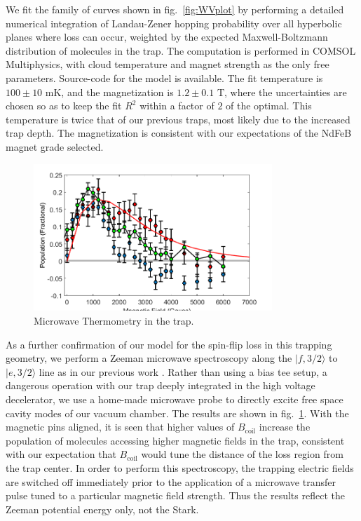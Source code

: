 \documentclass[%
 reprint,
 amsmath,amssymb,
 aps,
prl,
]{revtex4-1}
\begin{document}
We fit the family of curves shown in fig.~\ref{fig:WVplot} by performing a detailed numerical integration of Landau-Zener hopping probability over all hyperbolic planes where loss can occur, weighted by the expected Maxwell-Boltzmann distribution of molecules in the trap. The computation is performed in COMSOL Multiphysics, with cloud temperature and magnet strength as the only free parameters. Source-code for the model is available.\cite{ref:githubCOMcode} The fit temperature is $100\pm10\text{ mK}$, and the magnetization is $1.2\pm0.1\text{ T}$, where the uncertainties are chosen so as to keep the fit $R^2$ within a factor of $2$ of the optimal. This temperature is twice that of our previous traps, most likely due to the increased trap depth. The magnetization is consistent with our expectations of the NdFeB magnet grade selected.

\begin{figure}
\includegraphics[width=90mm]{MW-thermometry.png}%
\caption{
Microwave Thermometry in the trap.
\label{fig:spec}}
\end{figure}

As a further confirmation of our model for the spin-flip loss in this trapping geometry, we perform a Zeeman microwave spectroscopy along the $|f,3/2\rangle$ to $|e,3/2\rangle$ line as in our previous work \cite{stuhl2012evap}. Rather than using a bias tee setup, a dangerous operation with our trap deeply integrated in the high voltage decelerator, we use a home-made microwave probe to directly excite free space cavity modes of our vacuum chamber. The results are shown in fig.~\ref{fig:spec}. With the magnetic pins aligned, it is seen that higher values of $B_{\text{coil}}$ increase the population of molecules accessing higher magnetic fields in the trap, consistent with our expectation that $B_\text{coil}$ would tune the distance of the loss region from the trap center. In order to perform this spectroscopy, the trapping electric fields are switched off immediately prior to the application of a microwave transfer pulse tuned to a particular magnetic field strength. Thus the results reflect the Zeeman potential energy only, not the Stark.
\end{document}
